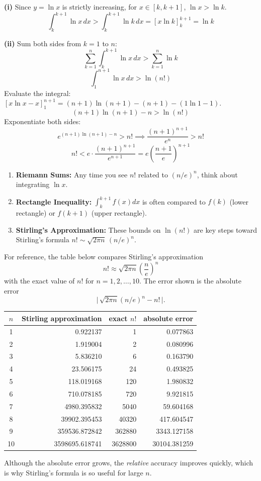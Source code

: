 \begin{solution}
\textbf{(i)} Since $y = \ln x$ is strictly increasing, for $x \in [k, k+1]$, $\ln x > \ln k$.
\[ \int_k^{k+1} \ln x \, dx > \int_k^{k+1} \ln k \, dx = [x \ln k]_k^{k+1} = \ln k \]

\textbf{(ii)} Sum both sides from $k=1$ to $n$:
\[ \sum_{k=1}^n \int_k^{k+1} \ln x \, dx > \sum_{k=1}^n \ln k \]
\[ \int_1^{n+1} \ln x \, dx > \ln(n!) \]
Evaluate the integral: $[x \ln x - x]_1^{n+1} = (n+1)\ln(n+1) - (n+1) - (1\ln 1 - 1)$.
\[ (n+1)\ln(n+1) - n > \ln(n!) \]
Exponentiate both sides:
\[ e^{(n+1)\ln(n+1) - n} > n! \implies \frac{(n+1)^{n+1}}{e^n} > n! \]
\[ n! < e \cdot \frac{(n+1)^{n+1}}{e^{n+1}} = e \left(\frac{n+1}{e}\right)^{n+1} \]
\end{solution}

\begin{takeaways}
\begin{enumerate}
    \item \textbf{Riemann Sums:} Any time you see $n!$ related to $(n/e)^n$, think about integrating $\ln x$.
    \item \textbf{Rectangle Inequality:} $\int_k^{k+1} f(x) dx$ is often compared to $f(k)$ (lower rectangle) or $f(k+1)$ (upper rectangle).
    \item \textbf{Stirling's Approximation:} These bounds on $\ln(n!)$ are key steps toward Stirling's formula $n! \sim \sqrt{2\pi n}\,(n/e)^n$.
\end{enumerate}
\end{takeaways}

\begin{remark}
For reference, the table below compares Stirling's approximation
\[
n! \approx \sqrt{2\pi n}\left(\frac{n}{e}\right)^n
\]
with the exact value of $n!$ for $n=1,2,\dots,10$. The error shown is the absolute error
\[
\bigl|\,\sqrt{2\pi n}(n/e)^n-n!\,\bigr|.
\]

\begin{center}
\small
\begin{tabular}{c|r|r|r}
$n$ & Stirling approximation & exact $n!$ & absolute error \\ \hline
1 & 0.922137 & 1 & 0.077863 \\
2 & 1.919004 & 2 & 0.080996 \\
3 & 5.836210 & 6 & 0.163790 \\
4 & 23.506175 & 24 & 0.493825 \\
5 & 118.019168 & 120 & 1.980832 \\
6 & 710.078185 & 720 & 9.921815 \\
7 & 4980.395832 & 5040 & 59.604168 \\
8 & 39902.395453 & 40320 & 417.604547 \\
9 & 359536.872842 & 362880 & 3343.127158 \\
10 & 3598695.618741 & 3628800 & 30104.381259
\end{tabular}
\normalsize
\end{center}

Although the absolute error grows, the \emph{relative} accuracy improves quickly, which is why Stirling's formula is so useful for large $n$.
\end{remark}

